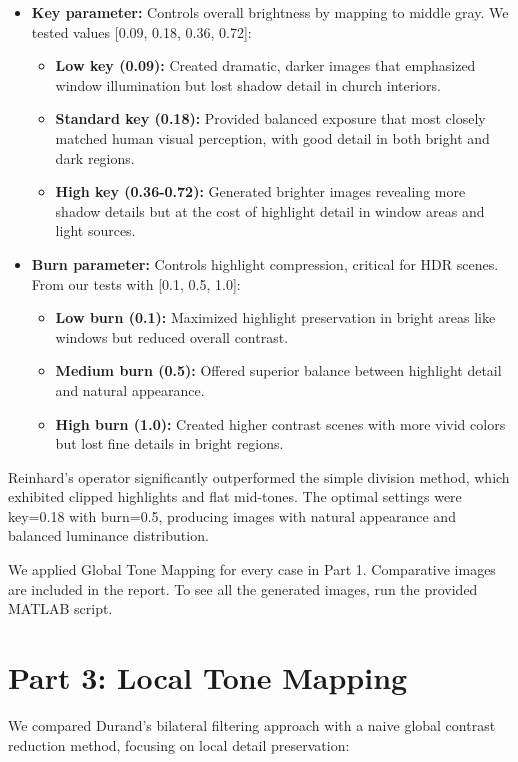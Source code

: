 \documentclass[a4paper,10pt]{article}
\begin{document}
\begin{itemize}
    \item \textbf{Key parameter:} Controls overall brightness by mapping to middle gray. We tested values [0.09, 0.18, 0.36, 0.72]:
    \begin{itemize}
        \item \textbf{Low key (0.09):} Created dramatic, darker images that emphasized window illumination but lost shadow detail in church interiors.
        \item \textbf{Standard key (0.18):} Provided balanced exposure that most closely matched human visual perception, with good detail in both bright and dark regions.
        \item \textbf{High key (0.36-0.72):} Generated brighter images revealing more shadow details but at the cost of highlight detail in window areas and light sources.
    \end{itemize}
    
    \item \textbf{Burn parameter:} Controls highlight compression, critical for HDR scenes. From our tests with [0.1, 0.5, 1.0]:
    \begin{itemize}
        \item \textbf{Low burn (0.1):} Maximized highlight preservation in bright areas like windows but reduced overall contrast.
        \item \textbf{Medium burn (0.5):} Offered superior balance between highlight detail and natural appearance.
        \item \textbf{High burn (1.0):} Created higher contrast scenes with more vivid colors but lost fine details in bright regions.
    \end{itemize}
\end{itemize}

Reinhard's operator significantly outperformed the simple division method, which exhibited clipped highlights and flat mid-tones. The optimal settings were key=0.18 with burn=0.5, producing images with natural appearance and balanced luminance distribution.

We applied Global Tone Mapping for every case in Part 1. Comparative images are included in the report. To see all the generated images, run the provided MATLAB script.

\section{Part 3: Local Tone Mapping}
We compared Durand's bilateral filtering approach with a naive global contrast reduction method, focusing on local detail preservation:
\end{document}
